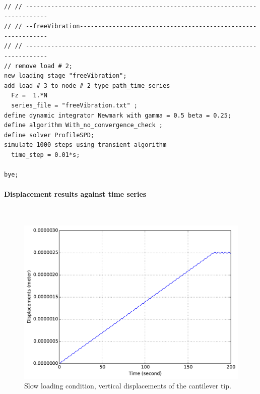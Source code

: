\documentclass[fleqn,11pt]{article}
\begin{document}
\begin{lstlisting}
// // ----------------------------------------------------------------------------
// // --freeVibration-------------------------------------------------------------
// // ----------------------------------------------------------------------------
// remove load # 2;
new loading stage "freeVibration";
add load # 3 to node # 2 type path_time_series 
  Fz =  1.*N
  series_file = "freeVibration.txt" ;
define dynamic integrator Newmark with gamma = 0.5 beta = 0.25;
define algorithm With_no_convergence_check ;
define solver ProfileSPD;
simulate 1000 steps using transient algorithm 
  time_step = 0.01*s;

bye;
\end{lstlisting}

\paragraph{Displacement results against time series} ~

\begin{figure}[!htb]
  \centering
  \includegraphics[width=12cm]{../Figure-files/_Chapter_Appendix_Illustrative_Examples/beam-mass-1element-slowLoading.pdf}
  \caption{Slow loading condition, vertical displacements of the cantilever tip.}
  \label{fig_beam-mass-slow}
\end{figure}
\end{document}
